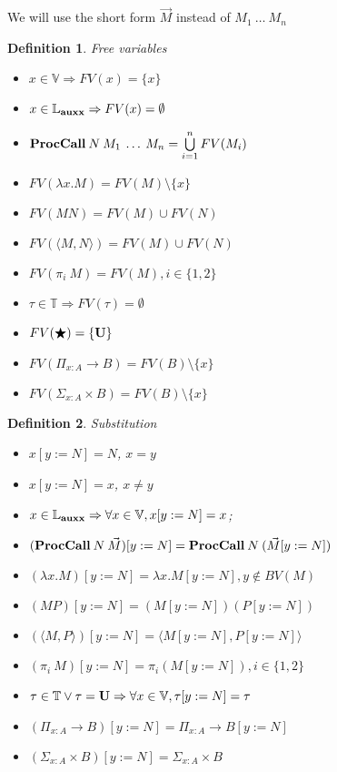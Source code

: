 \documentclass[a4paper]{article}
\newtheorem{defin}{Definition}
\begin{document}
We will use the short form $\vec{M}$ instead of $M_1 \: \dots \: M_n$

\begin{defin} Free variables

  \begin{itemize}
    \item $x \in \mathbb{V} \Rightarrow FV(x) = \{ x \}$
    \item $x \in \mathbb{L}_{\bf auxx} \Rightarrow FV(x) = \emptyset$
    \item ${\bf ProcCall \:} N \: M_1 \: \dots \: M_n = \bigcup \limits_{i = 1}^n FV(M_i)$
    \item $FV(\lambda x. M) = FV(M) \setminus \{ x \}$
    \item $FV(M N) = FV(M) \cup FV(N)$
    \item $FV(\langle M , N \rangle) = FV(M) \cup FV(N)$
    \item $FV (\pi_i \: M) = FV(M), i \in \{ 1, 2\}$
    \item $\tau \in \mathbb{T} \Rightarrow FV (\tau) = \emptyset$
    \item $FV (\bigstar) = \{ {\bf U} \}$
    \item $FV(\Pi_{x : A} \to B) = FV(B) \setminus \{ x \}$
    \item $FV(\Sigma_{x : A} \times B) = FV(B) \setminus \{ x \}$
  \end{itemize}
\end{defin}

\begin{defin} Substitution
  \begin{itemize}
    \item $x [y := N] = N$, $x = y$
    \item $x [y := N] = x$, $x \neq y$
    \item $x \in \mathbb{L}_{\bf auxx} \Rightarrow \forall x \in \mathbb{V}, x [y := N] = x$;
    \item $({\bf ProcCall \:} N \: \vec{M}) [y := N] = {\bf ProcCall \:} N \: (\vec{M} [y := N])$
    \item $(\lambda x. M) [y := N] = \lambda x. M [y := N], y \notin BV(M)$
    \item $(M P) [y := N] = (M [y := N]) (P [y := N])$
    \item $(\langle M , P \rangle) [y := N] = \langle M [y := N], P [y := N] \rangle$
    \item $(\pi_i \: M) [y := N] = \pi_i (M [y := N]), i \in \{ 1, 2\}$
    \item $\tau \in \mathbb{T} \vee \tau = {\bf U} \Rightarrow \forall x \in \mathbb{V}, \tau [y := N] = \tau$
    \item $(\Pi_{x : A} \to B) [y := N] = \Pi_{x : A} \to B [y := N]$
    \item $(\Sigma_{x : A} \times B) [y := N] = \Sigma_{x : A} \times B$
  \end{itemize}
\end{defin}
\end{document}
